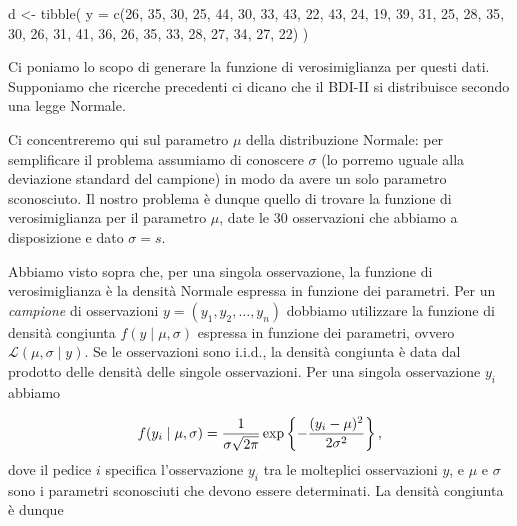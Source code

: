 \documentclass[
]{memoir}
\newenvironment{Shaded}{\begin{snugshade}}{\end{snugshade}}
\newcommand{\AttributeTok}[1]{\textcolor[rgb]{0.77,0.63,0.00}{#1}}
\newcommand{\DecValTok}[1]{\textcolor[rgb]{0.00,0.00,0.81}{#1}}
\newcommand{\FunctionTok}[1]{\textcolor[rgb]{0.00,0.00,0.00}{#1}}
\newcommand{\NormalTok}[1]{#1}
\newcommand{\OtherTok}[1]{\textcolor[rgb]{0.56,0.35,0.01}{#1}}
\theoremstyle{definition}
\theoremstyle{definition}
\theoremstyle{definition}
\theoremstyle{definition}
\theoremstyle{remark}
\begin{document}
\begin{Shaded}
\begin{Highlighting}[]
\NormalTok{d }\OtherTok{\textless{}{-}} \FunctionTok{tibble}\NormalTok{(}
  \AttributeTok{y =} \FunctionTok{c}\NormalTok{(}\DecValTok{26}\NormalTok{, }\DecValTok{35}\NormalTok{, }\DecValTok{30}\NormalTok{, }\DecValTok{25}\NormalTok{, }\DecValTok{44}\NormalTok{, }\DecValTok{30}\NormalTok{, }\DecValTok{33}\NormalTok{, }\DecValTok{43}\NormalTok{, }\DecValTok{22}\NormalTok{, }\DecValTok{43}\NormalTok{, }\DecValTok{24}\NormalTok{, }
        \DecValTok{19}\NormalTok{, }\DecValTok{39}\NormalTok{, }\DecValTok{31}\NormalTok{, }\DecValTok{25}\NormalTok{, }\DecValTok{28}\NormalTok{, }\DecValTok{35}\NormalTok{, }\DecValTok{30}\NormalTok{, }\DecValTok{26}\NormalTok{, }\DecValTok{31}\NormalTok{, }\DecValTok{41}\NormalTok{, }\DecValTok{36}\NormalTok{, }
        \DecValTok{26}\NormalTok{, }\DecValTok{35}\NormalTok{, }\DecValTok{33}\NormalTok{, }\DecValTok{28}\NormalTok{, }\DecValTok{27}\NormalTok{, }\DecValTok{34}\NormalTok{, }\DecValTok{27}\NormalTok{, }\DecValTok{22}\NormalTok{)}
\NormalTok{  )}
\end{Highlighting}
\end{Shaded}

Ci poniamo lo scopo di generare la funzione di verosimiglianza per questi dati. Supponiamo che ricerche precedenti ci dicano che il BDI-II si distribuisce secondo una legge Normale.

Ci concentreremo qui sul parametro \(\mu\) della distribuzione Normale: per semplificare il problema assumiamo di conoscere \(\sigma\) (lo porremo uguale alla deviazione standard del campione) in modo da avere un solo parametro sconosciuto. Il nostro problema è dunque quello di trovare la funzione di verosimiglianza per il parametro \(\mu\), date le 30 osservazioni che abbiamo a disposizione e dato \(\sigma = s\).

Abbiamo visto sopra che, per una singola osservazione, la funzione di verosimiglianza è la densità Normale espressa in funzione dei parametri. Per un \emph{campione} di osservazioni \(y = (y_1, y_2, \dots, y_n)\) dobbiamo utilizzare la funzione di densità congiunta \(f(y \mid \mu, \sigma)\) espressa in funzione dei parametri, ovvero \(\mathcal{L}(\mu, \sigma \mid y)\). Se le osservazioni sono i.i.d., la densità congiunta è data dal prodotto delle densità delle singole osservazioni. Per una singola osservazione \(y_i\) abbiamo

\[
f(y_i \mid \mu, \sigma) = \frac{1}{{\sigma \sqrt {2\pi}}}\exp\left\{{-\frac{(y_i - \mu)^2}{2\sigma^2}}\right\},\notag
\]
dove il pedice \(i\) specifica l'osservazione \(y_i\) tra le molteplici osservazioni \(y\), e \(\mu\) e \(\sigma\) sono i parametri sconosciuti che devono essere determinati. La densità congiunta è dunque
\end{document}
